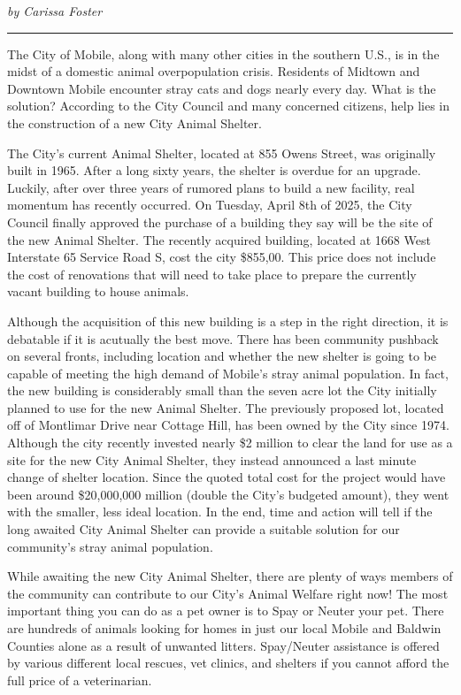 \documentclass[
]{book}
\begin{document}
\emph{by Carissa Foster}

\begin{center}\rule{0.5\linewidth}{0.5pt}\end{center}

The City of Mobile, along with many other cities in the southern U.S., is in the midst of a domestic animal overpopulation crisis. Residents of Midtown and Downtown Mobile encounter stray cats and dogs nearly every day. What is the solution? According to the City Council and many concerned citizens, help lies in the construction of a new City Animal Shelter.

The City's current Animal Shelter, located at 855 Owens Street, was originally built in 1965. After a long sixty years, the shelter is overdue for an upgrade. Luckily, after over three years of rumored plans to build a new facility, real momentum has recently occurred. On Tuesday, April 8th of 2025, the City Council finally approved the purchase of a building they say will be the site of the new Animal Shelter. The recently acquired building, located at 1668 West Interstate 65 Service Road S, cost the city \$855,00. This price does not include the cost of renovations that will need to take place to prepare the currently vacant building to house animals.

Although the acquisition of this new building is a step in the right direction, it is debatable if it is acutually the best move. There has been community pushback on several fronts, including location and whether the new shelter is going to be capable of meeting the high demand of Mobile's stray animal population. In fact, the new building is considerably small than the seven acre lot the City initially planned to use for the new Animal Shelter. The previously proposed lot, located off of Montlimar Drive near Cottage Hill, has been owned by the City since 1974. Although the city recently invested nearly \$2 million to clear the land for use as a site for the new City Animal Shelter, they instead announced a last minute change of shelter location. Since the quoted total cost for the project would have been around \$20,000,000 million (double the City's budgeted amount), they went with the smaller, less ideal location. In the end, time and action will tell if the long awaited City Animal Shelter can provide a suitable solution for our community's stray animal population.

While awaiting the new City Animal Shelter, there are plenty of ways members of the community can contribute to our City's Animal Welfare right now! The most important thing you can do as a pet owner is to Spay or Neuter your pet. There are hundreds of animals looking for homes in just our local Mobile and Baldwin Counties alone as a result of unwanted litters. Spay/Neuter assistance is offered by various different local rescues, vet clinics, and shelters if you cannot afford the full price of a veterinarian.
\end{document}

